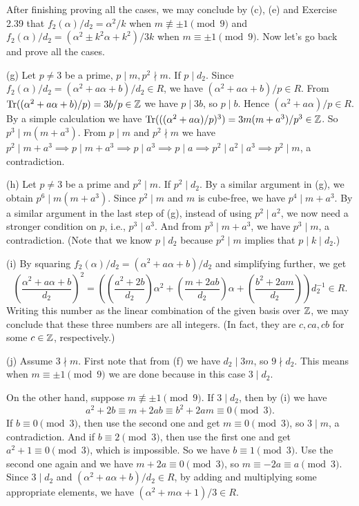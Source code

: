 \documentclass[../Marcus.tex]{subfiles}
\begin{document}
After finishing proving all the cases, we may conclude by (c), (e) and Exercise 2.39 that $f_2(\alpha)/d_2=\alpha^2/k$ when $m\not\equiv \pm1 \pmod{9}$ and $f_2(\alpha)/d_2=(\alpha^2\pm k^2\alpha+k^2)/3k$ when $m\equiv \pm1 \pmod{9}$. Now let's go back and prove all the cases.

(g) Let $p\neq 3$ be a prime, $p\mid m,p^2\nmid m$. If $p\mid d_2$. Since $f_2(\alpha)/d_2=(\alpha^2+a\alpha+b)/d_2\in R$, we have $(\alpha^2+a\alpha+b)/p\in R$. From $\operatorname{Tr}((\alpha^2+a\alpha+b)/p)=3b/p\in\mathbb{Z}$ we have $p\mid 3b$, so $p\mid b$. Hence $(\alpha^2+a\alpha)/p\in R$. By a simple calculation we have $\operatorname{Tr}(((\alpha^2+a\alpha)/p)^3) = 3m(m+a^3)/p^3\in\mathbb{Z}$. So $p^3\mid m(m+a^3)$. From $p\mid m$ and $p^2\nmid m$ we have $p^2\mid m+a^3\implies p\mid m+a^3\implies p\mid a^3\implies p\mid a\implies p^2\mid a^2\mid a^3\implies p^2\mid m$, a contradiction.

(h) Let $p\neq 3$ be a prime and $p^2\mid m$. If $p^2\mid d_2$. By a similar argument in (g), we obtain $p^6\mid m(m+a^3)$. Since $p^2\mid m$ and $m$ is cube-free, we have $p^4\mid m+a^3$. By a similar argument in the last step of (g), instead of using $p^2\mid a^2$, we now need a stronger condition on $p$, i.e., $p^3\mid a^3$. And from $p^3\mid m+a^3$, we have $p^3\mid m$, a contradiction. (Note that we know $p\mid d_2$ because $p^2\mid m$ implies that $p\mid k\mid d_2$.)

(i) By squaring $f_2(\alpha)/d_2=(\alpha^2+a\alpha+b)/d_2$ and simplifying further, we get
$$
\left(\frac{\alpha^2+a\alpha+b}{d_2}\right)^2=\left(\left(\frac{a^2+2b}{d_2}\right)\alpha^2+\left(\frac{m+2ab}{d_2}\right)\alpha+\left(\frac{b^2+2am}{d_2}\right)\right) d_2^{-1}\in R.
$$
Writing this number as the linear combination of the given basis over $\mathbb{Z}$, we may conclude that these three numbers are all integers. (In fact, they are $c,ca,cb$ for some $c\in\mathbb{Z}$, respectively.)

(j) Assume $3\nmid m$. First note that from (f) we have $d_2\mid 3m$, so $9\nmid d_2$. This means when $m\equiv \pm1 \pmod{9}$ we are done because in this case $3\mid d_2$.

On the other hand, suppose $m\not\equiv \pm1 \pmod{9}$. If $3\mid d_2$, then by (i) we have 
$$
a^2+2b\equiv m+2ab\equiv b^2+2am \equiv 0 \pmod{3}.
$$ 
If $b\equiv 0\pmod{3}$, then use the second one and get $m\equiv 0\pmod{3}$, so $3\mid m$, a contradiction. And if $b\equiv 2\pmod{3}$, then use the first one and get $a^2+1\equiv 0\pmod{3}$, which is impossible. So we have $b\equiv 1\pmod{3}$. Use the second one again and we have $m+2a\equiv 0\pmod{3}$, so $m\equiv -2a\equiv a \pmod{3}$. Since $3\mid d_2$ and $(\alpha^2+a\alpha+b)/d_2\in R$, by adding and multiplying some appropriate elements, we have $(\alpha^2+m\alpha+1)/3\in R$.
\end{document}

